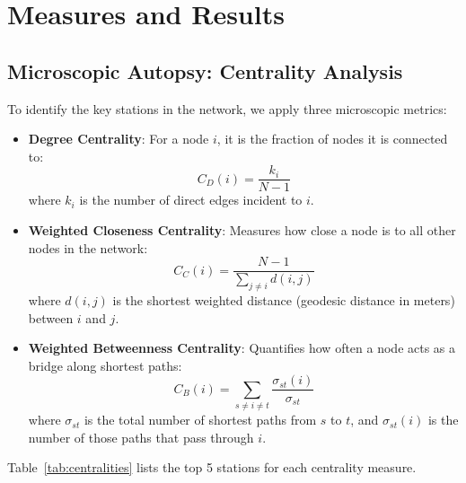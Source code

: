 \documentclass[12pt, a4paper]{article}
\begin{document}
\section{Measures and Results}
\label{measures}

\subsection{Microscopic Autopsy: Centrality Analysis}
To identify the key stations in the network, we apply three microscopic metrics:
\begin{itemize}
    \item \textbf{Degree Centrality}: For a node $i$, it is the fraction of nodes it is connected to:
    \begin{equation}
        C_D(i) = \frac{k_i}{N-1}
    \end{equation}
    where $k_i$ is the number of direct edges incident to $i$.
    \item \textbf{Weighted Closeness Centrality}: Measures how close a node is to all other nodes in the network:
    \begin{equation}
        C_C(i) = \frac{N-1}{\sum_{j \neq i} d(i, j)}
    \end{equation}
    where $d(i,j)$ is the shortest weighted distance (geodesic distance in meters) between $i$ and $j$.
    \item \textbf{Weighted Betweenness Centrality}: Quantifies how often a node acts as a bridge along shortest paths:
    \begin{equation}
        C_B(i) = \sum_{s \neq i \neq t} \frac{\sigma_{st}(i)}{\sigma_{st}}
    \end{equation}
    where $\sigma_{st}$ is the total number of shortest paths from $s$ to $t$, and $\sigma_{st}(i)$ is the number of those paths that pass through $i$.
\end{itemize}

Table~\ref{tab:centralities} lists the top 5 stations for each centrality measure. 

\begin{table}[htbp]
\centering
\caption{Top 5 London Underground Stations by Centrality Measures}
\label{tab:centralities}
\end{table}
\end{document}
